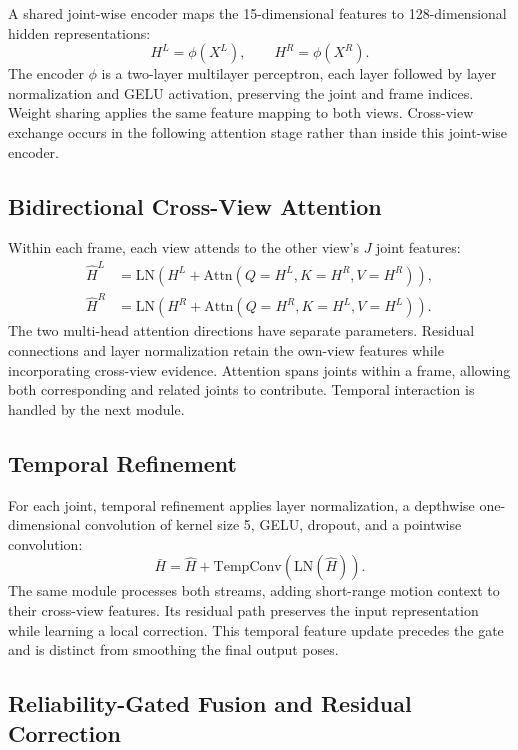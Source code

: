 \documentclass[preprint,12pt]{elsarticle}
\begin{document}
A shared joint-wise encoder maps the 15-dimensional features to 128-dimensional hidden representations:
\[
H^{L} = \phi(X^{L}),\qquad H^{R} = \phi(X^{R}).
\]
The encoder \(\phi\) is a two-layer multilayer perceptron, each layer followed by layer normalization and GELU activation, preserving the joint and frame indices. Weight sharing applies the same feature mapping to both views. Cross-view exchange occurs in the following attention stage rather than inside this joint-wise encoder.

\subsection{Bidirectional Cross-View Attention}
\label{subsec:cross_view_attention}

Within each frame, each view attends to the other view's \(J\) joint features:
\[
\begin{aligned}
\hat{H}^{L}&=\mathrm{LN}\!\left(H^{L}+\mathrm{Attn}(Q=H^{L},K=H^{R},V=H^{R})\right),\\
\hat{H}^{R}&=\mathrm{LN}\!\left(H^{R}+\mathrm{Attn}(Q=H^{R},K=H^{L},V=H^{L})\right).
\end{aligned}
\]
The two multi-head attention directions have separate parameters. Residual connections and layer normalization retain the own-view features while incorporating cross-view evidence. Attention spans joints within a frame, allowing both corresponding and related joints to contribute. Temporal interaction is handled by the next module.

\subsection{Temporal Refinement}
\label{subsec:temporal_refinement}

For each joint, temporal refinement applies layer normalization, a depthwise one-dimensional convolution of kernel size 5, GELU, dropout, and a pointwise convolution:
\[
\bar{H} = \hat{H} + \mathrm{TempConv}(\mathrm{LN}(\hat{H})).
\]
The same module processes both streams, adding short-range motion context to their cross-view features. Its residual path preserves the input representation while learning a local correction. This temporal feature update precedes the gate and is distinct from smoothing the final output poses.

\subsection{Reliability-Gated Fusion and Residual Correction}
\label{subsec:reliability_fusion}
\end{document}
